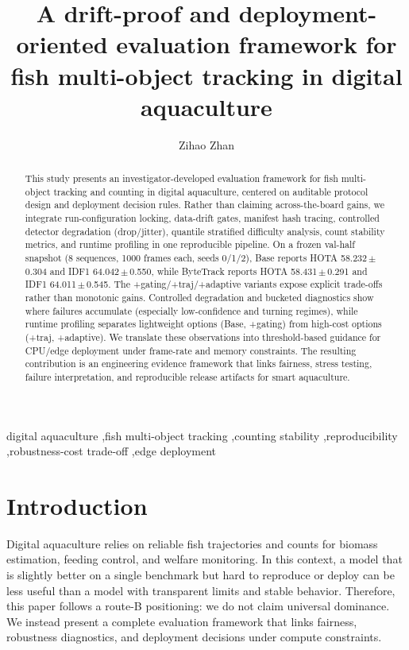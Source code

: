 \documentclass[preprint,12pt]{elsarticle}
\begin{document}
\begin{frontmatter}

\title{A drift-proof and deployment-oriented evaluation framework for fish multi-object tracking in digital aquaculture}

\author[aff1]{Zihao Zhan}
\address[aff1]{College of Fisheries, Huazhong Agricultural University, China}

\begin{abstract}
This study presents an investigator-developed evaluation framework for fish multi-object tracking and counting in digital aquaculture, centered on auditable protocol design and deployment decision rules. Rather than claiming across-the-board gains, we integrate run-configuration locking, data-drift gates, manifest hash tracing, controlled detector degradation (drop/jitter), quantile stratified difficulty analysis, count stability metrics, and runtime profiling in one reproducible pipeline. On a frozen val-half snapshot (8 sequences, 1000 frames each, seeds 0/1/2), Base reports HOTA 58.232\,$\pm$\,0.304 and IDF1 64.042\,$\pm$\,0.550, while ByteTrack reports HOTA 58.431\,$\pm$\,0.291 and IDF1 64.011\,$\pm$\,0.545. The +gating/+traj/+adaptive variants expose explicit trade-offs rather than monotonic gains. Controlled degradation and bucketed diagnostics show where failures accumulate (especially low-confidence and turning regimes), while runtime profiling separates lightweight options (Base, +gating) from high-cost options (+traj, +adaptive). We translate these observations into threshold-based guidance for CPU/edge deployment under frame-rate and memory constraints. The resulting contribution is an engineering evidence framework that links fairness, stress testing, failure interpretation, and reproducible release artifacts for smart aquaculture.
\end{abstract}

\begin{keyword}
digital aquaculture \sep fish multi-object tracking \sep counting stability \sep reproducibility \sep robustness-cost trade-off \sep edge deployment
\end{keyword}

\end{frontmatter}

\section{Introduction}
Digital aquaculture relies on reliable fish trajectories and counts for biomass estimation, feeding control, and welfare monitoring. In this context, a model that is slightly better on a single benchmark but hard to reproduce or deploy can be less useful than a model with transparent limits and stable behavior. Therefore, this paper follows a route-B positioning: we do not claim universal dominance. We instead present a complete evaluation framework that links fairness, robustness diagnostics, and deployment decisions under compute constraints.
\end{document}
